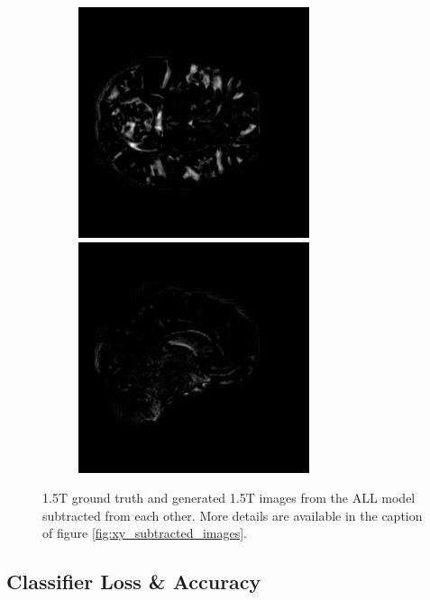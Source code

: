 \documentclass[12pt, fleqn, titlepage]{article}
\newcommand\skipperer{0.45pt}
\newcommand{\1}[1]{\mathds{1}\left[#1\right]}
\begin{document}
\begin{figure}[H]
\begin{subfigure}[b]{0.8\textwidth}
		\hskip\skipperer
		\includegraphics[width=0.22\linewidth]{imgs/subtracted_images/all/136_S_0196_xz_1.5_1.5gen_comparison}
		\hskip\skipperer
		\includegraphics[width=0.22\linewidth]{imgs/subtracted_images/all/136_S_0196_yz_1.5_1.5gen_comparison}
	\end{subfigure}
	\caption{1.5T ground truth and generated 1.5T images from the ALL model subtracted from each other. More details are available in the caption of figure \ref{fig:xy_subtracted_images}.}
	\label{fig:all_subtracted_images}
\end{figure}



\subsection{Classifier Loss \& Accuracy}
\end{document}
